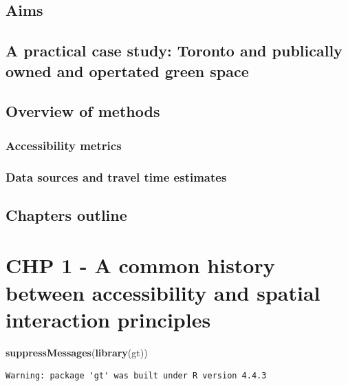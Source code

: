 \documentclass[
11pt, %
oneside, %
english, %
singlespacing, %
]{macthesis} %
\newenvironment{Shaded}{\begin{snugshade}}{\end{snugshade}}
\newcommand{\FunctionTok}[1]{\textcolor[rgb]{0.13,0.29,0.53}{\textbf{#1}}}
\newcommand{\NormalTok}[1]{#1}
\begin{document}
\section{Aims}\label{aims}

\section{A practical case study: Toronto and publically owned and opertated green space}\label{a-practical-case-study-toronto-and-publically-owned-and-opertated-green-space}

\section{Overview of methods}\label{overview-of-methods}

\subsection{Accessibility metrics}\label{accessibility-metrics}

\subsection{Data sources and travel time estimates}\label{data-sources-and-travel-time-estimates}

\section{Chapters outline}\label{chapters-outline}

\chapter{CHP 1 - A common history between accessibility and spatial interaction principles}\label{chp-1---a-common-history-between-accessibility-and-spatial-interaction-principles}

\begin{Shaded}
\begin{Highlighting}[]
\FunctionTok{suppressMessages}\NormalTok{(}\FunctionTok{library}\NormalTok{(gt))}
\end{Highlighting}
\end{Shaded}

\begin{verbatim}
Warning: package 'gt' was built under R version 4.4.3
\end{verbatim}
\end{document}
